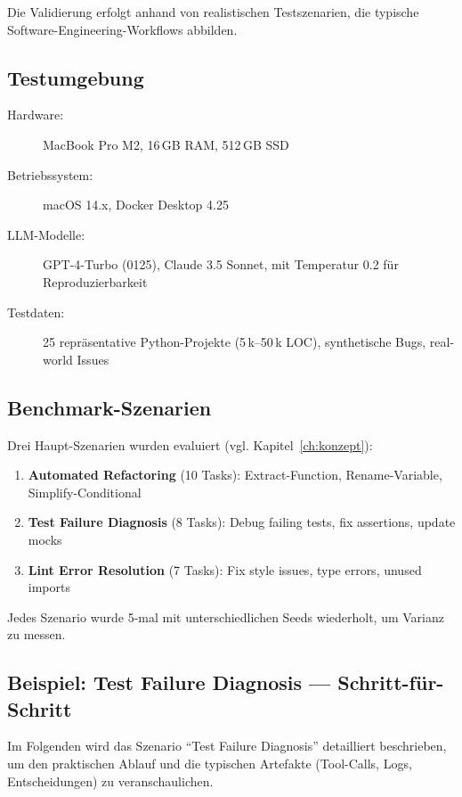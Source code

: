 Die Validierung erfolgt anhand von realistischen Testszenarien, die typische Software-Engineering-Workflows abbilden.

\subsection{Testumgebung}

\begin{sloppypar}
\begin{description}
  \item[Hardware:] MacBook Pro M2, 16\,GB RAM, 512\,GB SSD
  \item[Betriebssystem:] macOS 14.x, Docker Desktop 4.25
  \item[LLM-Modelle:] GPT-4-Turbo (0125), Claude 3.5 Sonnet, mit Temperatur 0.2 für Reproduzierbarkeit
  \item[Testdaten:] 25 repräsentative Python-Projekte (5\,k--50\,k LOC), synthetische Bugs, real-world Issues
\end{description}
\end{sloppypar}

\subsection{Benchmark-Szenarien}

Drei Haupt-Szenarien wurden evaluiert (vgl. Kapitel~\ref{ch:konzept}):

\begin{enumerate}
  \item \textbf{Automated Refactoring} (10 Tasks): Extract-Function, Rename-Variable, Simplify-Conditional
  \item \textbf{Test Failure Diagnosis} (8 Tasks): Debug failing tests, fix assertions, update mocks
  \item \textbf{Lint Error Resolution} (7 Tasks): Fix style issues, type errors, unused imports
\end{enumerate}

Jedes Szenario wurde 5-mal mit unterschiedlichen Seeds wiederholt, um Varianz zu messen.

\subsection{Beispiel: Test Failure Diagnosis — Schritt-für-Schritt}

Im Folgenden wird das Szenario \enquote{Test Failure Diagnosis} detailliert beschrieben, um den praktischen Ablauf und die typischen Artefakte (Tool-Calls, Logs, Entscheidungen) zu veranschaulichen.


